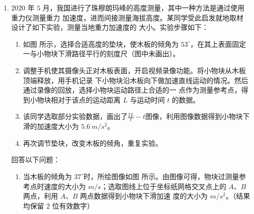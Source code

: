 \begin{enumerate}
\item
$ 2020 $ 年 $ 5 $ 月，我国进行了珠穆朗玛峰的高度测量，其中一种方法是通过使用重力仪测量重力
加速度，进而间接测量海拔高度。某同学受此启发就地取材设计了如下实验，测量当地重力加速度的
大小。实验步骤如下：
\begin{figure}[h!]
\centering
\begin{subfigure}{0.4\linewidth}
\centering
 
\caption{}\label{2020:山东:13a}
\end{subfigure}
\begin{subfigure}{0.8\linewidth}
\centering
 
\caption{}\label{2020:山东:13b}
\end{subfigure}
\end{figure}

\begin{enumerate}
\renewcommand{\labelenumii}{\roman{enumii}.}
\item
如图  所示，选择合适高度的垫块，使木板的倾角为 $ 53 ^{ \circ } $，在其上表面固定一与小物块下滑路径平行的刻度尺（图中未画出）。
\item 
调整手机使其摄像头正对木板表面，开启视频录像功能。将小物块从木板顶端释放，用手机记录
下小物块沿木板向下做加速直线运动的情况。然后通过录像的回放，选择小物块运动路径上合适的一
点作为测量参考点，得到小物块相对于该点的运动距离 $ L $ 与运动时间 $ t $ 的数据。
\item 
该同学选取部分实验数据，画出了$\frac{2 L}{t}-t$图像，利用图像数据得到小物块下滑的加速度大小为 $ 5.6 \ m/s^{2} $。
\item 
再次调节垫块，改变木板的倾角，重复实验。

\end{enumerate}


回答以下问题：
\begin{enumerate}
\item
当木板的倾角为 $ 37 ^{ \circ } $时，所绘图像如图  所示。由图像可得，物块过测量参考点时速度的大小为 \underlinegap 
$ m/s $；选取图线上位于坐标纸网格交叉点上的 $ A $、$ B $ 两点，利用 $ A $、$ B $ 两点数据得到小物块下滑加速
度的大小为 \underlinegap $ m/s^{2} $。（结果均保留 $ 2 $ 位有效数字）



\end{enumerate}
\end{enumerate}
